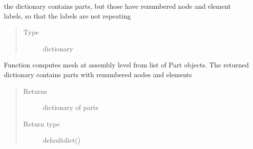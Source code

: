 \documentclass[letterpaper,10pt,english]{sphinxmanual}
\begin{document}
\begin{fulllineitems}
\begin{fulllineitems}
\begin{quote}
\begin{description}
\end{description}\end{quote}

\end{fulllineitems}


\begin{fulllineitems}
\label{\detokenize{pyCofea/api:cofea.Mesh.assemblyMesh}}
the dictionary contains parts, but those have renumbered        node and element labels, so that the labels are not        repeating
\begin{quote}\begin{description}
\item[{Type}] \leavevmode
dictionary

\end{description}\end{quote}

\end{fulllineitems}


\begin{fulllineitems}
\label{\detokenize{pyCofea/api:cofea.Mesh.computeAssemblyMesh}}
Function computes mesh at assembly level from list
of Part objects. The returned dictionary contains
parts with renumbered nodes and elements
\begin{quote}\begin{description}
\item[{Returns}] \leavevmode
dictionary of parts

\item[{Return type}] \leavevmode
defaultdict()

\end{description}\end{quote}

\end{fulllineitems}



\end{fulllineitems}
\end{document}
